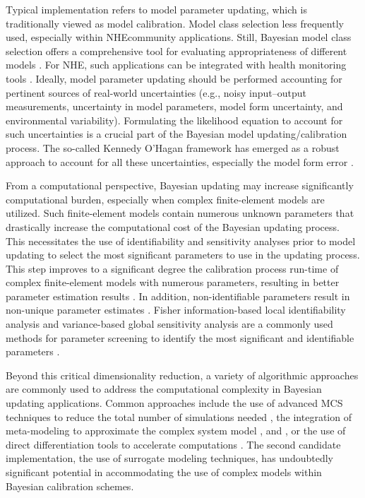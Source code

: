 Typical implementation refers to model parameter updating, which is traditionally viewed as model calibration. Model class selection less frequently used, especially within NHEcommunity applications. Still, Bayesian model class selection offers a comprehensive tool for evaluating appropriateness of different models \citep{muto2008bayesian}. For NHE, such applications can be integrated with health monitoring tools \citep{oh2018bayesian}. Ideally, model parameter updating should be performed accounting for pertinent sources of real-world uncertainties (e.g., noisy input--output measurements, uncertainty in model parameters, model form uncertainty, and environmental variability). Formulating the likelihood equation to account for such uncertainties is a crucial part of the Bayesian model updating/calibration process. The so-called Kennedy O'Hagan framework has emerged as a robust approach to account for all these uncertainties, especially the model form error \citep{kennedy2001bayesian}. 

From a computational perspective, Bayesian updating may increase significantly computational burden, especially when complex finite-element models are utilized. Such finite-element models contain numerous unknown parameters that drastically increase the computational cost of the Bayesian updating process. This necessitates the use of identifiability and sensitivity analyses prior to model updating to select the most significant parameters to use in the updating process. This step  improves to a significant degree the calibration process run-time of complex finite-element models with numerous parameters, resulting in better parameter estimation results \citep{ramancha2021bayesianupdating}. In addition, non-identifiable parameters result in non-unique parameter estimates \citep{ramancha2020nonunique}. Fisher information-based local identifiability analysis and variance-based global sensitivity analysis are a commonly used methods for parameter screening to identify the most significant and identifiable parameters \citep{ramancha2021bayesianupdating}.

Beyond this critical dimensionality reduction, a variety of algorithmic approaches are commonly used to address the computational complexity in Bayesian updating applications. Common approaches include the use of advanced MCS techniques to reduce the total number of simulations needed \citep{quiroz2018speeding}, the integration of meta-modeling to approximate the complex system model \citep{angelikopoulos2015xtmcmc, giovanis2017bayesian, wang2019reliabilitybased}, and \citep{zhang2019accelerating}, or the use of direct differentiation tools to accelerate computations \citep{astroza2017batch}. The second candidate implementation, the use of surrogate modeling techniques, has undoubtedly significant potential in accommodating the use of complex models within Bayesian calibration schemes.     

